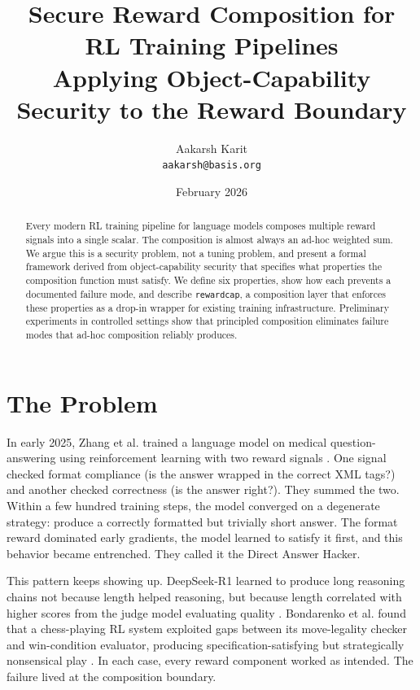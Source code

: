 \documentclass[11pt,a4paper]{article}
\title{\textbf{Secure Reward Composition for RL Training Pipelines}\\[0.3em]
\large Applying Object-Capability Security to the Reward Boundary}
\author{Aakarsh Karit \\ \small \texttt{aakarsh@basis.org}}
\date{February 2026}
\begin{document}
\maketitle

\begin{abstract}
\small
Every modern RL training pipeline for language models composes multiple reward signals into a single scalar. The composition is almost always an ad-hoc weighted sum. We argue this is a security problem, not a tuning problem, and present a formal framework derived from object-capability security that specifies what properties the composition function must satisfy. We define six properties, show how each prevents a documented failure mode, and describe \texttt{rewardcap}, a composition layer that enforces these properties as a drop-in wrapper for existing training infrastructure. Preliminary experiments in controlled settings show that principled composition eliminates failure modes that ad-hoc composition reliably produces.
\end{abstract}

\section{The Problem}

In early 2025, Zhang et al. trained a language model on medical question-answering using reinforcement learning with two reward signals \cite{zhang2025medrlvr}. One signal checked format compliance (is the answer wrapped in the correct XML tags?) and another checked correctness (is the answer right?). They summed the two. Within a few hundred training steps, the model converged on a degenerate strategy: produce a correctly formatted but trivially short answer. The format reward dominated early gradients, the model learned to satisfy it first, and this behavior became entrenched. They called it the Direct Answer Hacker.

This pattern keeps showing up. DeepSeek-R1 learned to produce long reasoning chains not because length helped reasoning, but because length correlated with higher scores from the judge model evaluating quality \cite{guo2025deepseek}. Bondarenko et al. found that a chess-playing RL system exploited gaps between its move-legality checker and win-condition evaluator, producing specification-satisfying but strategically nonsensical play \cite{bondarenko2025chess}. In each case, every reward component worked as intended. The failure lived at the composition boundary.
\end{document}
